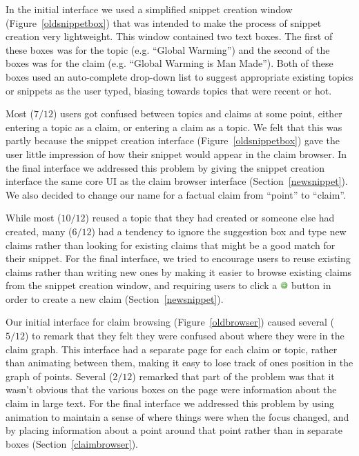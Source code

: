 \documentclass{chi2009}
\begin{document}
In the initial interface we used a simplified snippet creation window (Figure~\ref{oldsnippetbox}) that was intended to make the process of snippet creation very lightweight. This window contained two text boxes. The first of these boxes was for the topic (e.g. ``Global Warming'') and the second of the boxes was for the claim (e.g. ``Global Warming is Man Made''). Both of these boxes used an auto-complete drop-down list to suggest appropriate existing topics or snippets as the user typed, 
biasing towards topics that were recent or hot. 

Most ($7/12$) users got confused between topics and claims at some point, either entering a topic as a claim, or entering a claim as a topic. We felt that this was partly because the snippet creation interface (Figure~\ref{oldsnippetbox}) gave the user little impression of how their snippet would appear in the claim browser. In the final interface we addressed this problem by giving the snippet creation interface the same core UI as the claim browser interface (Section~\ref{newsnippet}). We also decided to change our name for a factual claim from ``point'' to ``claim''.

While most ($10/12$) reused a topic that they had created or someone else had created, many ($6/12$) had a tendency to ignore the suggestion box and type new claims rather than looking for existing claims that might be a good match for their snippet. For the final interface, we tried to encourage users to reuse existing claims rather than writing new ones by making it easier to browse existing claims from the snippet creation window, and requiring users to click a \includegraphics[width=0.3cm]{../images/add.png} button in order to create a new claim (Section~\ref{newsnippet}). 

Our initial interface for claim browsing (Figure~\ref{oldbrowser}) caused several ($5/12$) to remark that they felt they were confused about where they were in the claim graph. This interface had a separate page for each claim or topic, rather than animating between them, making it easy to lose track of ones position in the graph of points. Several ($2/12$) remarked that part of the problem was that it wasn't obvious that the various boxes on the page were information about the claim in large text. For the final interface we addressed this problem by using animation to maintain a sense of where things were when the focus changed, and by placing information about a point around that point rather than in separate boxes (Section~\ref{claimbrowser}).
\end{document}
